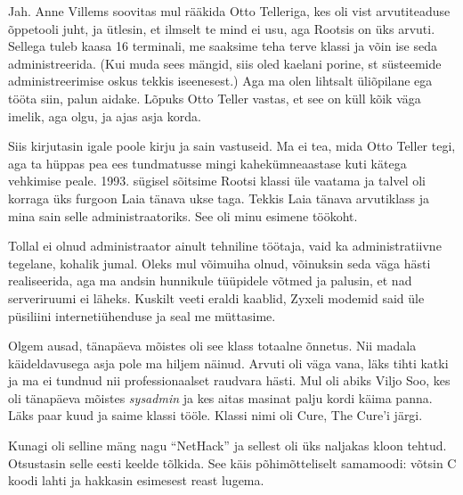  \label{sisu!jaanus_liivi_tn}

Jah. Anne Villems soovitas mul rääkida Otto Telleriga, kes oli vist 
arvutiteaduse õppetooli juht, ja ütlesin, et ilmselt te mind ei usu, aga Rootsis on üks arvuti. Sellega tuleb kaasa 16 terminali, 
me saaksime teha terve klassi ja võin ise seda 
administreerida. (Kui muda sees mängid, siis oled kaelani porine, st 
süsteemide administreerimise oskus tekkis iseenesest.) 
Aga ma olen lihtsalt üliõpilane ega tööta siin, palun aidake. Lõpuks Otto Teller vastas, et see on küll kõik
väga imelik, aga olgu, ja ajas asja korda.

Siis kirjutasin igale poole kirju ja sain vastuseid. Ma ei tea, mida Otto 
Teller tegi, aga ta hüppas pea ees tundmatusse mingi kahekümneaastase 
kuti kätega vehkimise peale. 1993. sügisel sõitsime Rootsi klassi 
üle vaatama ja talvel oli korraga üks furgoon 
Laia tänava ukse taga. Tekkis Laia tänava arvutiklass ja mina sain selle administraatoriks. See oli minu 
esimene töökoht.

Tollal ei olnud administraator ainult tehniline töötaja, vaid ka 
administratiivne tegelane, kohalik jumal. Oleks mul võimuiha olnud, 
võinuksin seda väga hästi realiseerida, aga ma andsin hunnikule tüüpidele 
võtmed ja palusin, et nad serveriruumi ei läheks. Kuskilt 
veeti eraldi kaablid, Zyxeli modemid said üle püsiliini 
internetiühenduse ja seal me müttasime.

Olgem ausad, tänapäeva mõistes oli see klass totaalne õnnetus. Nii 
madala käideldavusega asja pole ma hiljem näinud. Arvuti oli väga 
vana, läks tihti katki ja ma ei tundnud nii professionaalset raudvara hästi. Mul oli abiks Viljo 
Soo, kes oli tänapäeva mõistes \emph{sysadmin} ja kes 
aitas masinat palju kordi käima panna. Läks paar kuud ja 
saime klassi tööle. Klassi nimi oli Cure, 
The Cure'i järgi. 

Kunagi oli selline mäng nagu \enquote{NetHack}\label{sisu:nethack} ja sellest oli 
üks naljakas kloon tehtud. Otsustasin selle eesti keelde 
tõlkida. See käis põhimõtteliselt samamoodi: võtsin C koodi lahti ja 
hakkasin esimesest reast lugema.

